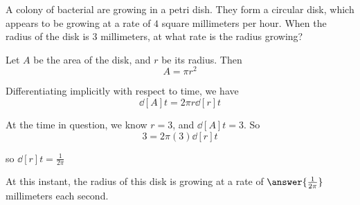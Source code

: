\documentclass{ximera}
\author{Steven Gubkin}
\begin{document}
\begin{exercise}



A colony of bacterial are growing in a petri dish.  They form a
circular disk, which appears to be growing at a rate of $4$ square
millimeters per hour.  When the radius of the disk is $3$ millimeters,
at what rate is the radius growing?

\begin{hint}
  Let $A$ be the area of the disk, and $r$ be its radius.  Then
  \[
  A = \pi r^2
  \]
\end{hint}

\begin{hint}
  Differentiating implicitly with respect to time, we have
  \[
  \dd[A]{t} = 2\pi r \dd[r]{t}
  \]
\end{hint}

\begin{hint}
  At the time in question, we know $r = 3$, and $\dd[A]{t} = 3$.
  So
  \[
  3 = 2 \pi (3) \dd[r]{t}
  \]

so $\dd[r]{t} = \frac{1}{2\pi}$
\end{hint}

\begin{prompt}
  At this instant, the radius of this disk is growing at a rate
  of $\answer{\frac{1}{2\pi}}$ millimeters each second.
\end{prompt}

\end{exercise}
\end{document}

